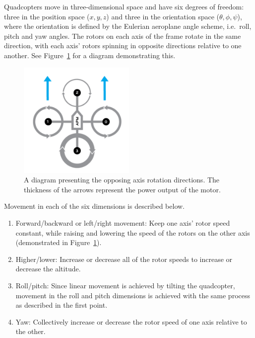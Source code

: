 Quadcopters move in three-dimensional space and have six degrees of freedom: three in the position space ($x, y, z$) and three in the orientation space ($\theta, \phi, \psi$), where the orientation is defined by the Eulerian aeroplane angle scheme, i.e.\ roll, pitch and yaw angles. The rotors on each axis of the frame rotate in the same direction, with each axis' rotors spinning in opposite directions relative to one another. See Figure~\ref{fig:chap2-quad-rotation} for a diagram demonstrating this. 
\begin{figure}
  \centering
  \includegraphics[width=0.5\textwidth]{figures/chapter2/quad_axis.pdf}
  \caption[Diagram presenting the opposing axis rotations directions.]{A diagram presenting the opposing axis rotation directions. The thickness of the arrows represent the power output of the motor.~\cite{quad-rotation-pic}}
\label{fig:chap2-quad-rotation}
\end{figure}
Movement in each of the six dimensions is described below. 

\begin{enumerate}
  \item Forward/backward or left/right movement: Keep one axis' rotor speed constant, while raising and lowering the speed of the rotors on the other axis (demonstrated in Figure~\ref{fig:chap2-quad-rotation}).
  \item Higher/lower: Increase or decrease all of the rotor speeds to increase or decrease the altitude.
  \item Roll/pitch: Since linear movement is achieved by tilting the quadcopter, movement in the roll and pitch dimensions is achieved with the same process as described in the first point. 
  \item Yaw: Collectively increase or decrease the rotor speed of one axis relative to the other. 
\end{enumerate}

